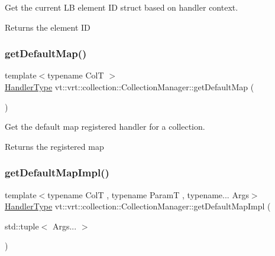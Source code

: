 Get the current LB element ID struct based on handler context. 

\begin{DoxyReturn}{Returns}
the element ID 
\end{DoxyReturn}
\mbox{\label{structvt_1_1vrt_1_1collection_1_1_collection_manager_aa371f1cdd4eafa9f75b7eb40a6f151e0}} 
\subsubsection{\texorpdfstring{get\+Default\+Map()}{getDefaultMap()}}
{\footnotesize\ttfamily template$<$typename ColT $>$ \\
\hyperlink{namespacevt_af64846b57dfcaf104da3ef6967917573}{Handler\+Type} vt\+::vrt\+::collection\+::\+Collection\+Manager\+::get\+Default\+Map (\begin{DoxyParamCaption}{ }\end{DoxyParamCaption})\hspace{0.3cm}{\ttfamily [static]}}



Get the default map registered handler for a collection. 

\begin{DoxyReturn}{Returns}
the registered map 
\end{DoxyReturn}
\mbox{\label{structvt_1_1vrt_1_1collection_1_1_collection_manager_ae92ad81b99b380b0b87b85f7dbda767a}} 
\subsubsection{\texorpdfstring{get\+Default\+Map\+Impl()}{getDefaultMapImpl()}}
{\footnotesize\ttfamily template$<$typename ColT , typename ParamT , typename... Args$>$ \\
\hyperlink{namespacevt_af64846b57dfcaf104da3ef6967917573}{Handler\+Type} vt\+::vrt\+::collection\+::\+Collection\+Manager\+::get\+Default\+Map\+Impl (\begin{DoxyParamCaption}\item[{std\+::tuple$<$ Args... $>$}]{ }\end{DoxyParamCaption})\hspace{0.3cm}{\ttfamily [static]}}



